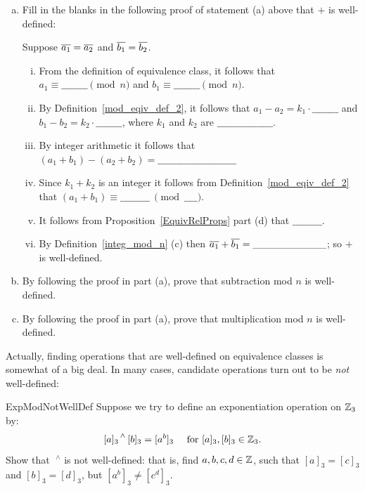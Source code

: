 \begin{exercise}{54} 
\begin{enumerate}[(a)]
\item 
Fill in the blanks in the following proof of statement (a) above that $\mathbin{+}$ is well-defined: 

Suppose $\overline{a_1} = \overline{a_2}$ and $\overline{b_1} = \overline{b_2}$. 
\begin{enumerate}[(i)]
\item
From the definition of equivalence class, it follows that  $a_1 \equiv \_\_\_\_\_\_\_\_ \pmod{n}$ and $b_1 \equiv \_\_\_\_\_\_\_\_ \pmod{n}$. 
\item  
By Definition~\ref{mod_eqiv_def_2}, it follows that 
$a_1 - a_2 = k_1 \cdot \_\_\_\_\_\_\_\_$ and $b_1 - b_2 = k_2 \cdot \_\_\_\_\_\_\_\_$, where $k_1$ and $k_2$ are $\_\_\_\_\_\_\_\_\_\_\_\_\_\_\_\_\_$. 
\item
By integer arithmetic it follows that $(a_1 + b_1) - (a_2 + b_2) =  \_\_\_\_\_\_\_\_\_\_\_\_\_\_\_\_\_\_\_\_\_\_\_\_$
\item
Since $k_1 + k_2$ is an integer it follows from Definition~\ref{mod_eqiv_def_2} that $(a_1 + b_1) \equiv \_\_\_\_\_\_\_\_\_\ \pmod{\_\_\_\_}$.
\item 
It follows from Proposition~\ref{EquivRelProps} part (d) that $\_\_\_\_\_\_\_\_\_$.
\item
By Definition~\ref{integ_mod_n} (c) then $\overline{a_1} \mathbin{+} \overline{b_1} =  \_\_\_\_\_\_\_\_\_\_$; so $\mathbin{+}$ is well-defined.
\end{enumerate}
\item By following the proof in part (a), prove that subtraction mod $n$ is well-defined.
\item By following the proof in part (a), prove that multiplication mod $n$ is well-defined.
\end{enumerate}
\end{exercise}

Actually, finding operations that are well-defined on equivalence classes is somewhat of a big deal. In many cases, candidate operations turn out to be \emph{not} well-defined:

\begin{exercise}{ExpModNotWellDef}
Suppose we try to define an exponentiation operation on $\mathbb{Z}_3$ by:
\[
 {[a]_3}^{\,\wedge} \, [b]_3 = [a^b]_3 \quad \text{ for } [a]_3, [b]_3 \in \mathbb{Z}_3. \]
Show that $\;^{\wedge}$ is not well-defined: that is, find $a, b, c, d \in \mathbb{Z}$, such that $[a]_3 = [c]_3$ and $[b]_3 = [d]_3$, but $\left[a^b \right]_3 \neq \left[c^d \right]_3$.
\end{exercise}

